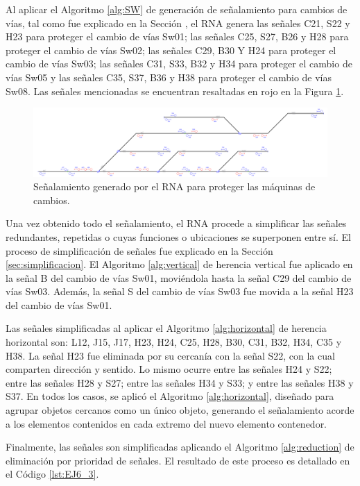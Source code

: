 	Al aplicar el Algoritmo \ref{alg:SW} de generación de señalamiento para cambios de vías, tal como fue explicado en la Sección \label{sec:signal_switches}, el RNA genera las señales C21, S22 y H23 para proteger el cambio de vías Sw01; las señales C25, S27, B26 y H28 para proteger el cambio de vías Sw02; las señales C29, B30 Y H24 para proteger el cambio de vías Sw03; las señales C31, S33, B32 y H34 para proteger el cambio de vías Sw05 y las señales C35, S37, B36 y H38 para proteger el cambio de vías Sw08. Las señales mencionadas se encuentran resaltadas en rojo en la Figura \ref{fig:EJ6_6}.
	
	 \begin{figure}[H]
		\centering
		\includegraphics[width=1\textwidth]{resultados-obtenidos/ejemplo6/images/6_step4.png}
		\centering\caption{Señalamiento generado por el RNA para proteger las máquinas de cambios.}
		\label{fig:EJ6_6}
	\end{figure}
	
	Una vez obtenido todo el señalamiento, el RNA procede a simplificar las señales redundantes, repetidas o cuyas funciones o ubicaciones se superponen entre sí. El proceso de simplificación de señales fue explicado en la Sección \ref{sec:simplificacion}. El Algoritmo \ref{alg:vertical} de herencia vertical fue aplicado en la señal B del cambio de vías Sw01, moviéndola hasta la señal C29 del cambio de vías Sw03. Además, la señal S del cambio de vías Sw03 fue movida a la señal H23 del cambio de vías Sw01.
	
	Las señales simplificadas al aplicar el Algoritmo \ref{alg:horizontal} de herencia horizontal son: L12, J15, J17, H23, H24, C25, H28, B30, C31, B32, H34, C35 y H38. La señal H23 fue eliminada por su cercanía con la señal S22, con la cual comparten dirección y sentido. Lo mismo ocurre entre las señales H24 y S22; entre las señales H28 y S27; entre las señales H34 y S33; y entre las señales H38 y S37. En todos los casos, se aplicó el Algoritmo \ref{alg:horizontal}, diseñado para agrupar objetos cercanos como un único objeto, generando el señalamiento acorde a los elementos contenidos en cada extremo del nuevo elemento contenedor.
	
	Finalmente, las señales son simplificadas aplicando el Algoritmo \ref{alg:reduction} de eliminación por prioridad de señales. El resultado de este proceso es detallado en el Código \ref{lst:EJ6_3}.
	
